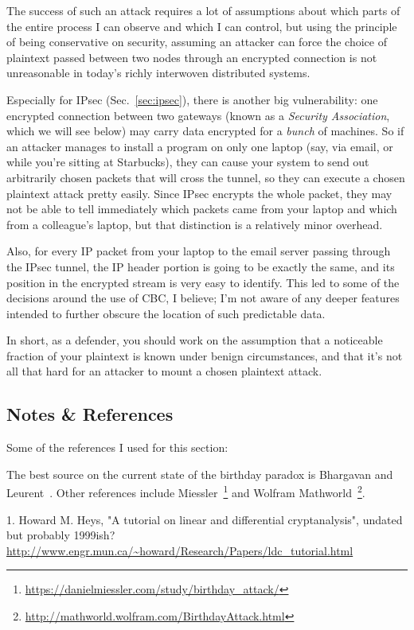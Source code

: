 The success of such an attack requires a lot of assumptions about
which parts of the entire process I can observe and which I can
control, but using the principle of being conservative on security,
assuming an attacker can force the choice of plaintext passed between
two nodes through an encrypted connection is not unreasonable in
today's richly interwoven distributed systems.

Especially for IPsec (Sec.~\ref{sec:ipsec}), there is another big
vulnerability: one encrypted connection between two gateways (known as
a \emph{Security Association}, which we will see below) may carry data
encrypted for a \emph{bunch} of machines.  So if an attacker manages
to install a program on only one laptop (say, via email, or while
you're sitting at Starbucks), they can cause your system to send out
arbitrarily chosen packets that will cross the tunnel, so they can
execute a chosen plaintext attack pretty easily.  Since IPsec encrypts
the whole packet, they may not be able to tell immediately which
packets came from your laptop and which from a colleague's laptop, but
that distinction is a relatively minor overhead.

Also, for every IP packet from your laptop to the email server passing
through the IPsec tunnel, the IP header portion is going to be exactly
the same, and its position in the encrypted stream is very easy to
identify.  This led to some of the decisions around the use of CBC, I
believe; I'm not aware of any deeper features intended to further
obscure the location of such predictable data.

In short, as a defender, you should work on the assumption that a
noticeable fraction of your plaintext is known under benign
circumstances, and that it's not all that hard for an attacker to
mount a chosen plaintext attack.

\subsection{Notes \& References}

Some of the references I used for this section:

The best source on the current state of the birthday paradox is Bhargavan and Leurent~\cite{bhargavan2016practical}.  Other references include Miessler~\footnote{\url{https://danielmiessler.com/study/birthday_attack/}} and Wolfram Mathworld~\footnote{\url{http://mathworld.wolfram.com/BirthdayAttack.html}}.

1. Howard M. Heys, "A tutorial on linear and differential
cryptanalysis", undated but probably 1999ish?
\url{http://www.engr.mun.ca/~howard/Research/Papers/ldc_tutorial.html}

